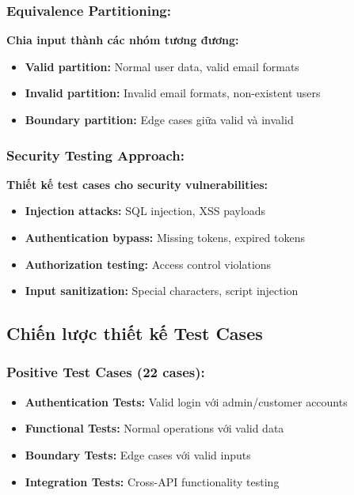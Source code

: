 \documentclass[12pt,a4paper]{article}
\begin{document}
  \subsubsection{Equivalence Partitioning:}
  \textbf{Chia input thành các nhóm tương đương:}
  \begin{itemize}
  \item \textbf{Valid partition:} Normal user data, valid email formats
  \item \textbf{Invalid partition:} Invalid email formats, non-existent users
  \item \textbf{Boundary partition:} Edge cases giữa valid và invalid
  \end{itemize}

  \subsubsection{Security Testing Approach:}
  \textbf{Thiết kế test cases cho security vulnerabilities:}
  \begin{itemize}
  \item \textbf{Injection attacks:} SQL injection, XSS payloads
  \item \textbf{Authentication bypass:} Missing tokens, expired tokens
  \item \textbf{Authorization testing:} Access control violations
  \item \textbf{Input sanitization:} Special characters, script injection
  \end{itemize}

  \subsection{Chiến lược thiết kế Test Cases}

  \subsubsection{Positive Test Cases (22 cases):}
  \begin{itemize}
  \item \textbf{Authentication Tests:} Valid login với admin/customer accounts
  \item \textbf{Functional Tests:} Normal operations với valid data
  \item \textbf{Boundary Tests:} Edge cases với valid inputs
  \item \textbf{Integration Tests:} Cross-API functionality testing
  \end{itemize}
\end{document}
